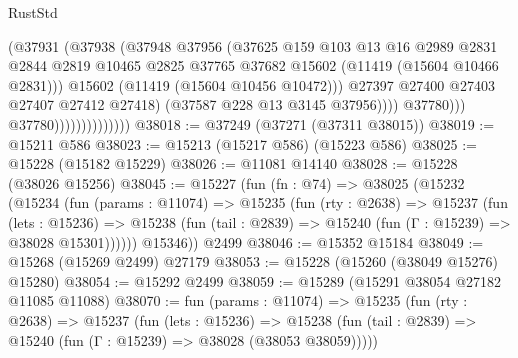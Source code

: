 \begin{lexlean}{RustStd}
\begin{coremodule}
                                          (@37931
                                            (@37938
                                              (@37948
                                                @37956
                                                (@37625
                                                  @159
                                                  @103
                                                  @13
                                                  @16
                                                  @2989
                                                  @2831
                                                  @2844
                                                  @2819
                                                  @10465
                                                  @2825
                                                  @37765
                                                  @37682
                                                  @15602
                                                  (@11419 (@15604 @10466 @2831)))
                                                @15602
                                                (@11419 (@15604 @10456 @10472)))
                                              @27397
                                              @27400
                                              @27403
                                              @27407
                                              @27412
                                              @27418)
                                            (@37587 @228 @13 @3145 @37956))))
                                      @37780)))
                                @37780))))))))))))))
@38018 := @37249 (@37271 (@37311 @38015))
@38019 := @15211 @586
@38023 := @15213 (@15217 @586) (@15223 @586)
@38025 := @15228 (@15182 @15229)
@38026 := @11081 @14140
@38028 := @15228 (@38026 @15256)
@38045 := @15227
    (fun (fn : @74) =>
    @38025
      (@15232
        (@15234
          (fun (params : @11074) =>
          @15235
            (fun (rty : @2638) =>
            @15237
              (fun (lets : @15236) =>
              @15238 (fun (tail : @2839) => @15240 (fun (Γ : @15239) => @38028 @15301))))))
        @15346))
    @2499
@38046 := @15352 @15184
@38049 := @15268 (@15269 @2499) @27179
@38053 := @15228 (@15260 (@38049 @15276) @15280)
@38054 := @15292 @2499
@38059 := @15289 (@15291 @38054 @27182 @11085 @11088)
@38070 := fun (params : @11074) =>
  @15235
    (fun (rty : @2638) =>
    @15237
      (fun (lets : @15236) =>
      @15238 (fun (tail : @2839) => @15240 (fun (Γ : @15239) => @38028 (@38053 @38059)))))

\end{coremodule}
\end{lexlean}
